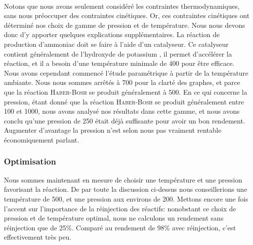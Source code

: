 \paragraph{} Notons que nous avons seulement considéré les contraintes thermodynamiques, sans nous préoccuper des contraintes
cinétiques. Or, ces contraintes cinétiques ont déterminé nos choix de gamme de pression et de température. Nous nous
devons donc d'y apporter quelques explications supplémentaires.
La réaction de production d'ammoniac doit se faire à l'aide d'un catalyseur. Ce catalyseur contient généralement de
l'hydroxyde de potassium , il permet d'accélérer la réaction, et il a besoin d'une température minimale de \unit{400}{\celsius}
pour être efficace.\cite{ib} Nous avons cependant commencé l'étude paramétrique à partir de la température ambiante. Nous nous sommes
arrêtés à \unit{700}{\celsius} pour la clarté des graphes, et parce que la réaction \textsc{Haber-Bosh} se produit généralement à \unit{500}{\celsius}.
En ce qui concerne la pression, étant donné que la réaction \textsc{Haber-Bosh} se produit généralement entre \unit{100}{\bbar} et \unit{1000}{\bbar},
nous avons analysé nos résultats dans cette gamme, et nous avons conclu qu'une pression de \unit{250}{\bbar} était déjà
suffisante pour avoir un bon rendement. Augmenter d'avantage la pression n'est selon nous pas vraiment rentable économiquement parlant.
\subsubsection{Optimisation}
Nous sommes maintenant en mesure de choisir une température et une pression favorisant la réaction. De par
toute la discussion ci-dessus nous conseillerions une température de \unit{500}{\celsius}, et une pression aux environs de \unit{200}{\bbar}. Mettons encore une fois l'accent sur l'importance de la réinjection des réactifs: nonobstant ce choix de pression et de température optimal, nous ne calculons un rendement sans réinjection que de 25\%. Comparé au rendement de 98\% avec réinjection, c'est effectivement très peu.
